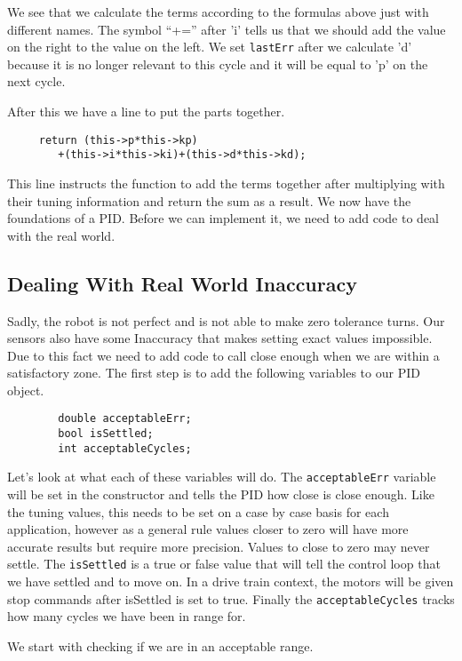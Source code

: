 \documentclass[12pt]{article}
\begin{document}
    We see that we calculate the terms according to the formulas above just with different names. The symbol ``+='' after 'i' tells us that we should add the value on the right to the value on the left. We set \verb|lastErr| after we calculate 'd' because it is no longer relevant to this cycle and it will be equal to 'p' on the next cycle.

    After this we have a line to put the parts together.
    \begin{verbatim}
     return (this->p*this->kp)
        +(this->i*this->ki)+(this->d*this->kd);
    \end{verbatim}

    This line instructs the function to add the terms together after multiplying with their tuning information and return the sum as a result. We now have the foundations of a PID. Before we can implement it, we need to add code to deal with the real world.

\subsection{Dealing With Real World Inaccuracy}
    Sadly, the robot is not perfect and is not able to make zero tolerance turns. Our sensors also have some Inaccuracy that makes setting exact values impossible. Due to this fact we need to add code to call close enough when we are within a satisfactory zone. The first step is to add the following variables to our PID object.

    \begin{verbatim}
        double acceptableErr;
        bool isSettled;
        int acceptableCycles;
    \end{verbatim}

    Let's look at what each of these variables will do. The \verb|acceptableErr| variable will be set in the constructor and tells the PID how close is close enough. Like the tuning values, this needs to be set on a case by case basis for each application, however as a general rule values closer to zero will have more accurate results but require more precision. Values to close to zero may never settle. The \verb|isSettled| is a true or false value that will tell the control loop that we have settled and to move on. In a drive train context, the motors will be given stop commands after isSettled is set to true. Finally the \verb|acceptableCycles| tracks how many cycles we have been in range for.

    We start with checking if we are in an acceptable range.
\end{document}
